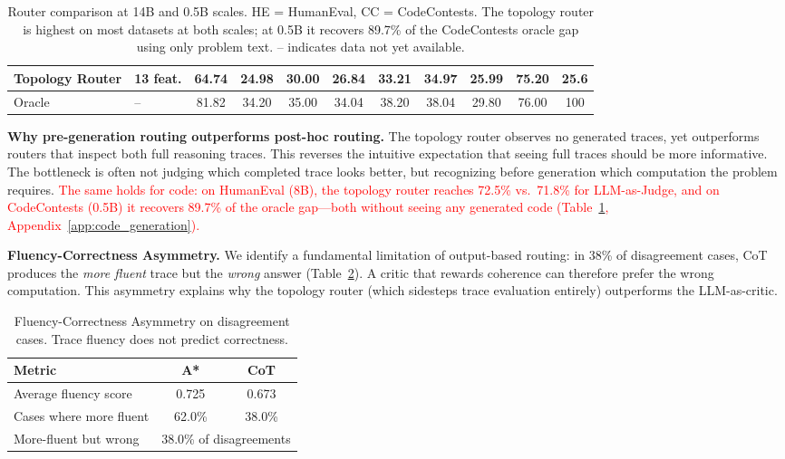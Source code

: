 \documentclass[10pt]{article}
\begin{document}
{\begin{table}[ht]
{\begin{tabular}{llccccccccc}
\textbf{Topology Router} & \textbf{13 feat.} & \textbf{64.74} & 24.98 & 30.00 & \textbf{26.84} & \textbf{33.21} & \textbf{34.97} & 25.99 & \textbf{75.20} & \textbf{25.6} \\
\midrule
Oracle & -- & 81.82 & 34.20 & 35.00 & 34.04 & 38.20 & 38.04 & 29.80 & 76.00 & 100 \\
\bottomrule
\end{tabular}}
\caption{Router comparison at 14B and 0.5B scales. HE = HumanEval, CC = CodeContests. The topology router is highest on most datasets at both scales; at 0.5B it recovers 89.7\% of the CodeContests oracle gap using only problem text. -- indicates data not yet available.}
\label{tab:router_14b_05b}
\end{table}
}%

\textbf{Why pre-generation routing outperforms post-hoc routing.}
The topology router observes no generated traces, yet outperforms routers that inspect both full reasoning traces. This reverses the intuitive expectation that seeing full traces should be more informative. The bottleneck is often not judging which completed trace looks better, but recognizing before generation which computation the problem requires. \textcolor{red}{The same holds for code: on HumanEval (8B), the topology router reaches 72.5\% vs.\ 71.8\% for LLM-as-Judge, and on CodeContests (0.5B) it recovers 89.7\% of the oracle gap---both without seeing any generated code (Table~\ref{tab:router_14b_05b}, Appendix~\ref{app:code_generation}).}

\textbf{Fluency-Correctness Asymmetry.}
We identify a fundamental limitation of output-based routing: in 38\% of disagreement cases, CoT produces the \emph{more fluent} trace but the \emph{wrong} answer (Table~\ref{tab:fluency_asymmetry}). A critic that rewards coherence can therefore prefer the wrong computation. This asymmetry explains why the topology router (which sidesteps trace evaluation entirely) outperforms the LLM-as-critic.

\begin{table}[t]
\centering
\small
\begin{tabular}{lcc}
\toprule
\textbf{Metric} & \textbf{A*} & \textbf{CoT} \\
\midrule
Average fluency score & 0.725 & 0.673 \\
Cases where more fluent & 62.0\% & 38.0\% \\
More-fluent but wrong & \multicolumn{2}{c}{38.0\% of disagreements} \\
\bottomrule
\end{tabular}
\caption{Fluency-Correctness Asymmetry on disagreement cases. Trace fluency does not predict correctness.}
\label{tab:fluency_asymmetry}
\end{table}
\end{document}
